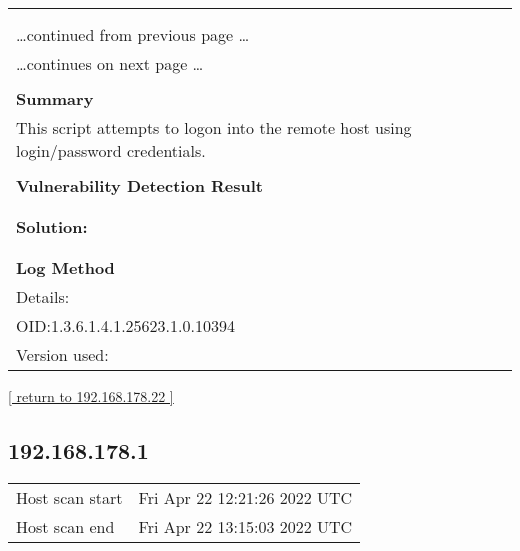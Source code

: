 \documentclass{article}
\begin{document}
\begin{longtable}{|p{}|}
\hline
\rowcolor{gvm_log}{\color{white}{Log (CVSS: 0.0) }}\\
\rowcolor{gvm_log}{\color{white}{NVT: SMB log in}}\\
\hline
\endfirsthead
\hfill\ldots continued from previous page \ldots \\
\hline
\endhead
\hline
\ldots continues on next page \ldots \\
\endfoot
\hline
\endlastfoot
\\
\textbf{Summary}\\
This script attempts to logon into the remote host using
  login/password credentials.\\

        \hline
        \\
\textbf{Vulnerability Detection Result}\\
\rowcolor{white}{\verb=It was possible to log into the remote host using the SMB protocol.=}\\

          \hline
          \\
\textbf{Solution:}\\
\\


        \hline
        \\
\textbf{Log Method}\\
Details:
\rowcolor{white}{\verb=SMB log in=}\\
OID:1.3.6.1.4.1.25623.1.0.10394\\
Version used:
\rowcolor{white}{\verb=2021-08-11T09:39:10Z=}\\
\end{longtable}

\begin{footnotesize}\hyperref[host:192.168.178.22]{[ return to 192.168.178.22 ]}\end{footnotesize}
\subsection{192.168.178.1}
\label{host:192.168.178.1}

\begin{tabular}{ll}
Host scan start&Fri Apr 22 12:21:26 2022 UTC\\
Host scan end&Fri Apr 22 13:15:03 2022 UTC\\
\end{tabular}
\end{document}
